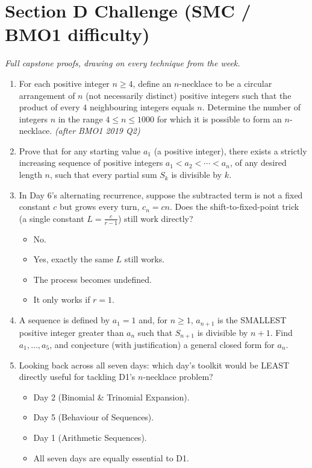 \documentclass[11pt,a4paper]{article}
\begin{document}
\section*{Section D \quad Challenge \hfill{\normalfont\small(SMC / BMO1 difficulty)}}

\noindent\textit{Full capstone proofs, drawing on every technique from the week.}

\begin{enumerate}

\item For each positive integer $n\geq4$, define an $n$-necklace to be a circular arrangement of $n$ (not necessarily distinct) positive integers such that the product of every $4$ neighbouring integers equals $n$. Determine the number of integers $n$ in the range $4\leq n\leq1000$ for which it is possible to form an $n$-necklace. \textit{\small(after BMO1 2019 Q2)}

\item Prove that for any starting value $a_1$ (a positive integer), there exists a strictly increasing sequence of positive integers $a_1<a_2<\cdots<a_n$, of any desired length $n$, such that every partial sum $S_k$ is divisible by $k$.

\item In Day 6's alternating recurrence, suppose the subtracted term is not a fixed constant $c$ but grows every turn, $c_n=cn$. Does the shift-to-fixed-point trick (a single constant $L=\frac c{r-1}$) still work directly?
\begin{itemize}
\item[A)] No.
\item[B)] Yes, exactly the same $L$ still works.
\item[C)] The process becomes undefined.
\item[D)] It only works if $r=1$.
\end{itemize}

\item A sequence is defined by $a_1=1$ and, for $n\geq1$, $a_{n+1}$ is the SMALLEST positive integer greater than $a_n$ such that $S_{n+1}$ is divisible by $n+1$. Find $a_1,\ldots,a_5$, and conjecture (with justification) a general closed form for $a_n$.

\item Looking back across all seven days: which day's toolkit would be LEAST directly useful for tackling D1's $n$-necklace problem?
\begin{itemize}
\item[A)] Day 2 (Binomial \& Trinomial Expansion).
\item[B)] Day 5 (Behaviour of Sequences).
\item[C)] Day 1 (Arithmetic Sequences).
\item[D)] All seven days are equally essential to D1.
\end{itemize}

\end{enumerate}

\end{document}
